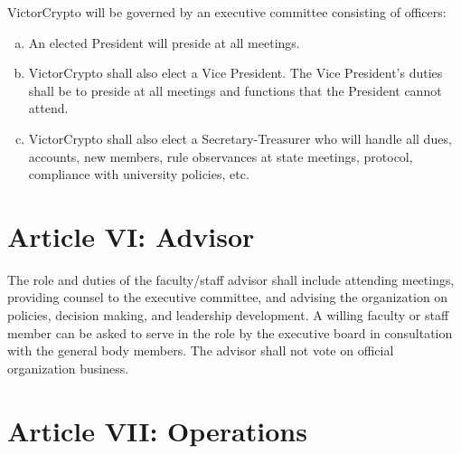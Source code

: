 \documentclass[11pt]{article}
\begin{document}
    VictorCrypto will be governed by an executive committee consisting of officers:

    \begin{enumerate}
        [a)]
        \item An elected President will preside at all meetings.
        \item VictorCrypto shall also elect a Vice President.
        The Vice President's duties shall be to preside at all meetings and functions that the President cannot attend.
        \item VictorCrypto shall also elect a Secretary-Treasurer who will handle all dues, accounts, new members, rule observances at state meetings, protocol, compliance with university policies, etc.
    \end{enumerate}


    \section{Article VI: Advisor}

    The role and duties of the faculty/staff advisor shall include attending meetings, providing counsel to the executive committee, and advising the organization on policies, decision making, and leadership development.
    A willing faculty or staff member can be asked to serve in the role by the executive board in consultation with the general body members.
    The advisor shall not vote on official organization business.


    \section{Article VII: Operations}
\end{document}
